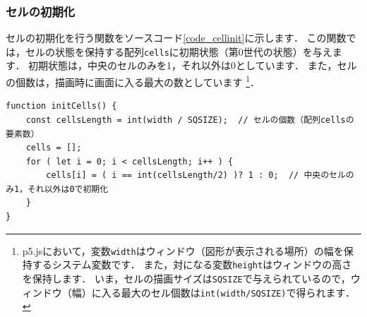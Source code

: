 \documentclass[dvipdfmx]{jsarticle}
\theoremstyle{definition}
\begin{document}
\subsubsection{セルの初期化}  \label{subsubsec_cell_init}
セルの初期化を行う関数をソースコード\ref{code_cellinit}に示します．
この関数では，セルの状態を保持する配列\verb|cells|に初期状態（第0世代の状態）を与えます．
初期状態は，中央のセルのみを1，それ以外は0としています．
また，セルの個数は，描画時に画面に入る最大の数としています
\footnote{
    \label{fnote_display_window}
    p5.jsにおいて，変数\texttt{width}はウィンドウ（図形が表示される場所）の幅を保持するシステム変数です．
    また，対になる変数\texttt{height}はウィンドウの高さを保持します．
    いま，セルの描画サイズは\texttt{SQSIZE}で与えられているので，ウィンドウ（幅）に入る最大のセル個数は\texttt{int(width/SQSIZE)}で得られます．
}．
%
\begin{lstlisting}[caption=セルの初期化関数, label=code_cellinit]
function initCells() {
    const cellsLength = int(width / SQSIZE);  // セルの個数（配列cellsの要素数）
    cells = [];
    for ( let i = 0; i < cellsLength; i++ ) {
        cells[i] = ( i == int(cellsLength/2) )? 1 : 0;  // 中央のセルのみ1，それ以外は0で初期化
    }
}
\end{lstlisting}

\end{document}
